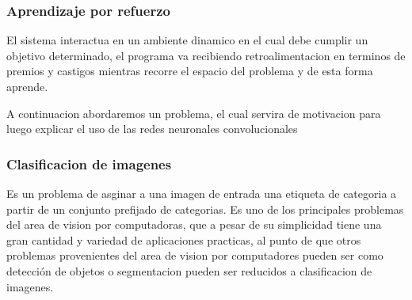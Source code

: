\documentclass[a4paper,10pt]{article}
\begin{document}
  \subsubsection{Aprendizaje por refuerzo}
    El sistema interactua en un ambiente dinamico en el cual debe cumplir un objetivo determinado, el programa va recibiendo retroalimentacion en terminos de premios y castigos mientras 
    recorre el espacio del problema y de esta forma aprende.

  \pagebreak

  A continuacion abordaremos un problema, el cual servira de motivacion para luego explicar el uso de las redes neuronales convolucionales

  \subsubsection{Clasificacion de imagenes }
    Es un problema de asginar a una imagen de entrada una etiqueta de categoria a partir de un conjunto prefijado de categorias.
    Es uno de los principales problemas del area de vision por computadoras, que a pesar de su simplicidad tiene una gran cantidad y variedad de aplicaciones practicas, 
    al punto de que otros problemas provenientes del area de vision por computadores pueden ser como detección de objetos o segmentacion pueden ser reducidos a clasificacion de imagenes.
\end{document}
